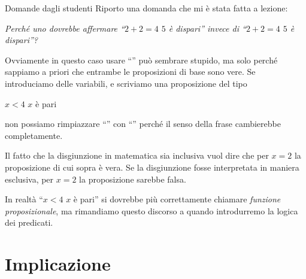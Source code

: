 \documentclass[aspectratio=169,10pt,dvipsnames,handout]{beamer}
\begin{document}
\begin{frame}{Domande dagli studenti}
    Riporto una domanda che mi è stata fatta a lezione:

    \medskip
    \emph{Perché uno dovrebbe affermare ``$2 + 2 = 4$  $5$ è dispari'' invece di ``$2 + 2 = 4$  $5$ è dispari''?}

    \medskip
    Ovviamente in questo caso usare ``'' può sembrare stupido, ma solo perché sappiamo a priori che entrambe le proposizioni di base sono vere. Se introduciamo delle variabili, e scriviamo una proposizione del tipo
    \begin{center}
        $x < 4$  $x$ è pari
    \end{center}
    non possiamo rimpiazzare ``'' con ``'' perché il senso della frase cambierebbe completamente.

    \smallskip
    Il fatto che la disgiunzione in matematica sia inclusiva vuol dire che per $x=2$ la proposizione di cui sopra è vera. Se la disgiunzione fosse interpretata in maniera esclusiva, per $x=2$ la proposizione sarebbe falsa.

    \pause\smallskip
    In realtà ``$x < 4$  $x$ è pari'' si dovrebbe più correttamente chiamare \emph{funzione proposizionale}, ma rimandiamo questo discorso a quando introdurremo la logica dei predicati.
\end{frame}

\section{Implicazione}
\end{document}
